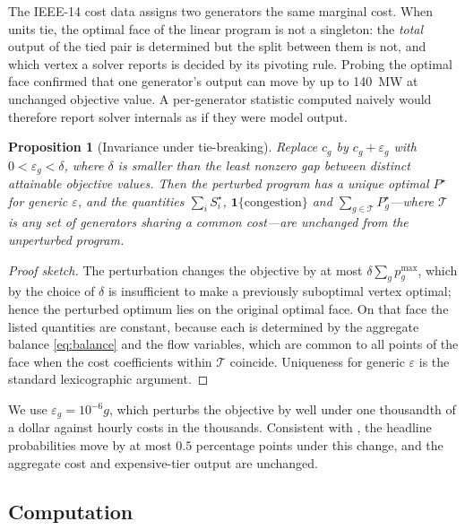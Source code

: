 \documentclass[11pt,a4paper]{article}
\theoremstyle{definition}
\theoremstyle{plain}
\newtheorem{proposition}[definition]{Proposition}
\theoremstyle{remark}
\begin{document}
The IEEE-14 cost data assigns two generators the same marginal cost. When units
tie, the optimal face of the linear program is not a singleton: the \emph{total}
output of the tied pair is determined but the split between them is not, and
which vertex a solver reports is decided by its pivoting rule. Probing the
optimal face confirmed that one generator's output can move by up to
\SI{140}{\mega\watt} at unchanged objective value. A per-generator statistic
computed naively would therefore report solver internals as if they were model
output.

\begin{proposition}[Invariance under tie-breaking]\label{prop:tiebreak}
Replace $c_g$ by $c_g + \varepsilon_g$ with
$0 < \varepsilon_g < \delta$, where $\delta$ is smaller than the least nonzero
gap between distinct attainable objective values. Then the perturbed program has
a unique optimal $P^\star$ for generic $\varepsilon$, and the quantities
$\sum_i S_i^\star$, $\mathbf{1}\{\text{congestion}\}$ and
$\sum_{g \in \mathcal{T}} P^\star_g$---where $\mathcal{T}$ is any set of
generators sharing a common cost---are unchanged from the unperturbed program.
\end{proposition}

\begin{proof}[Proof sketch]
The perturbation changes the objective by at most
$\delta \sum_g p^{\max}_g$, which by the choice of $\delta$ is insufficient to
make a previously suboptimal vertex optimal; hence the perturbed optimum lies on
the original optimal face. On that face the listed quantities are constant,
because each is determined by the aggregate balance \eqref{eq:balance} and the
flow variables, which are common to all points of the face when the cost
coefficients within $\mathcal{T}$ coincide. Uniqueness for generic $\varepsilon$
is the standard lexicographic argument. \qedhere
\end{proof}

We use $\varepsilon_g = 10^{-6} g$, which perturbs the objective by well under
one thousandth of a dollar against hourly costs in the thousands. Consistent with
, the headline probabilities move by at most
$0.5$ percentage points under this change, and the aggregate cost and
expensive-tier output are unchanged.

\subsection{Computation}
\end{document}

